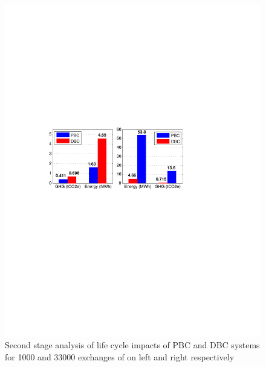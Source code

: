 \documentclass[3p,times,procedia]{elsarticle}
\begin{document}
\begin{figure}[t]
\includegraphics[width=\linewidth]{fs.pdf}
\caption{Second stage analysis of life cycle impacts of PBC and DBC systems for 1000 and 33000 exchanges of on left and right respectively}
\label{fig:onescore}
\endminipage\hfill
\end{figure}
\end{document}
